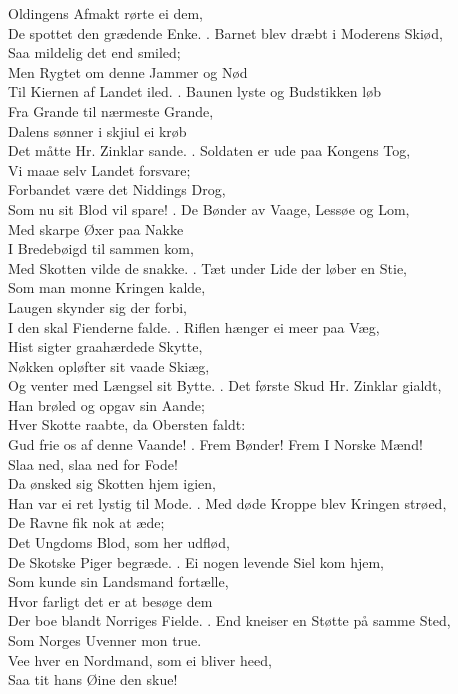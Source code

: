 \begin{flushleft}
Oldingens Afmakt rørte ei dem,\\
De spottet den grædende Enke.
. Barnet blev dræbt i Moderens Skiød,\\
Saa mildelig det end smiled;\\
Men Rygtet om denne Jammer og Nød\\
Til Kiernen af Landet iled.
. Baunen lyste og Budstikken løb\\
Fra Grande til nærmeste Grande,\\
Dalens sønner i skjiul ei krøb\\
Det måtte Hr. Zinklar sande. 
. Soldaten er ude paa Kongens Tog,\\
Vi maae selv Landet forsvare;\\
Forbandet være det Niddings Drog,\\
Som nu sit Blod vil spare!
. De Bønder av Vaage, Lessøe og Lom,\\
Med skarpe Øxer paa Nakke\\
I Bredebøigd til sammen kom,\\
Med Skotten vilde de snakke.
. Tæt under Lide der løber en Stie,\\
Som man monne Kringen kalde,\\
Laugen skynder sig der forbi,\\
I den skal Fienderne falde.
. Riflen hænger ei meer paa Væg,\\
Hist sigter graahærdede Skytte,\\
Nøkken opløfter sit vaade Skiæg,\\
Og venter med Længsel sit Bytte.
. Det første Skud Hr. Zinklar gialdt,\\
Han brøled og opgav sin Aande;\\
Hver Skotte raabte, da Obersten faldt:\\
Gud frie os af denne Vaande!
. Frem Bønder! Frem I Norske Mænd!\\
Slaa ned, slaa ned for Fode!\\
Da ønsked sig Skotten hjem igien,\\
Han var ei ret lystig til Mode.
. Med døde Kroppe blev Kringen strøed,\\
De Ravne fik nok at æde;\\
Det Ungdoms Blod, som her udflød,\\
De Skotske Piger begræde.
. Ei nogen levende Siel kom hjem,\\
Som kunde sin Landsmand fortælle,\\
Hvor farligt det er at besøge dem\\
Der boe blandt Norriges Fielde.
. End kneiser en Støtte på samme Sted,\\
Som Norges Uvenner mon true.\\
Vee hver en Nordmand, som ei bliver heed,\\
Saa tit hans Øine den skue! 
\end{flushleft}
\nxt
\nxt

